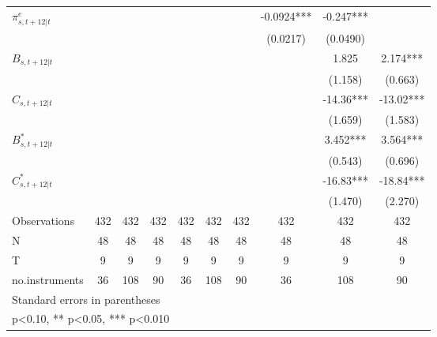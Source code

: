 \begin{table}[htbp]
\begin{tabular}{l*{9}{c}}
\addlinespace
$\pi^e_{s,t+12|t}$  &               &               &               &               &               &               &     -0.0924***&      -0.247***&               \\
                    &               &               &               &               &               &               &    (0.0217)   &    (0.0490)   &               \\
\addlinespace
$B_{s,t+12|t}$      &               &               &               &               &               &               &               &       1.825   &       2.174***\\
                    &               &               &               &               &               &               &               &     (1.158)   &     (0.663)   \\
\addlinespace
$C_{s,t+12|t}$      &               &               &               &               &               &               &               &      -14.36***&      -13.02***\\
                    &               &               &               &               &               &               &               &     (1.659)   &     (1.583)   \\
\addlinespace
$B^*_{s,t+12|t}$    &               &               &               &               &               &               &               &       3.452***&       3.564***\\
                    &               &               &               &               &               &               &               &     (0.543)   &     (0.696)   \\
\addlinespace
$C^*_{s,t+12|t}$    &               &               &               &               &               &               &               &      -16.83***&      -18.84***\\
                    &               &               &               &               &               &               &               &     (1.470)   &     (2.270)   \\
\midrule
Observations        &         432   &         432   &         432   &         432   &         432   &         432   &         432   &         432   &         432   \\
N                   &          48   &          48   &          48   &          48   &          48   &          48   &          48   &          48   &          48   \\
T                   &           9   &           9   &           9   &           9   &           9   &           9   &           9   &           9   &           9   \\
no.instruments      &          36   &         108   &          90   &          36   &         108   &          90   &          36   &         108   &          90   \\
\bottomrule
\multicolumn{10}{l}{\footnotesize Standard errors in parentheses}\\
\multicolumn{10}{l}{\footnotesize * p<0.10, ** p<0.05, *** p<0.010}\\
\end{tabular}
\end{table}
